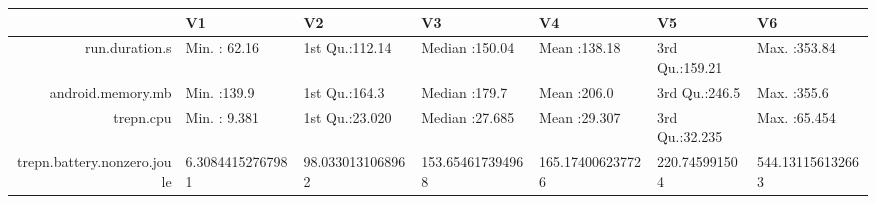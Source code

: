 \begin{table}[ht]
\centering
\begin{tabular}{rllllll}
  \hline
 & V1 & V2 & V3 & V4 & V5 & V6 \\ 
  \hline
run.duration.s & Min.   : 62.16   & 1st Qu.:112.14   & Median :150.04   & Mean   :138.18   & 3rd Qu.:159.21   & Max.   :353.84   \\ 
  android.memory.mb & Min.   :139.9   & 1st Qu.:164.3   & Median :179.7   & Mean   :206.0   & 3rd Qu.:246.5   & Max.   :355.6   \\ 
    trepn.cpu & Min.   : 9.381   & 1st Qu.:23.020   & Median :27.685   & Mean   :29.307   & 3rd Qu.:32.235   & Max.   :65.454   \\ 
  trepn.battery.nonzero.joule & 6.30844152767981 & 98.0330131068962 & 153.654617394968 & 165.174006237726 & 220.745991504 & 544.131156132663 \\ 
   \hline
\end{tabular}
\end{table}
